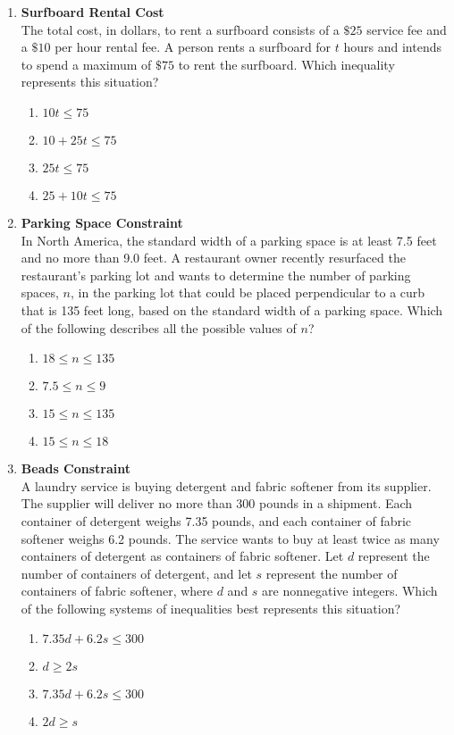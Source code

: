 \begin{enumerate}
\item \textbf{Surfboard Rental Cost}\\
The total cost, in dollars, to rent a surfboard consists of a $\$ 25$ service fee and a $\$ 10$ per hour rental fee. A person rents a surfboard for $t$ hours and intends to spend a maximum of $\$ 75$ to rent the surfboard. Which inequality represents this situation?
\begin{enumerate}[label=(\Alph*)]
  \item $10t \leq 75$
  \item $10 + 25t \leq 75$
  \item $25t \leq 75$
  \item $25 + 10t \leq 75$
\end{enumerate}
\begin{subanswer}
\end{subanswer}

\item \textbf{Parking Space Constraint}\\
In North America, the standard width of a parking space is at least 7.5 feet and no more than 9.0 feet. A restaurant owner recently resurfaced the restaurant's parking lot and wants to determine the number of parking spaces, $n$, in the parking lot that could be placed perpendicular to a curb that is 135 feet long, based on the standard width of a parking space. Which of the following describes all the possible values of $n$?
\begin{enumerate}[label=(\Alph*)]
  \item $18 \leq n \leq 135$
  \item $7.5 \leq n \leq 9$
  \item $15 \leq n \leq 135$
  \item $15 \leq n \leq 18$
\end{enumerate}
\begin{subanswer}
\end{subanswer}

\item \textbf{Beads Constraint}\\
A laundry service is buying detergent and fabric softener from its supplier. The supplier will deliver no more than 300 pounds in a shipment. Each container of detergent weighs 7.35 pounds, and each container of fabric softener weighs 6.2 pounds. The service wants to buy at least twice as many containers of detergent as containers of fabric softener. Let $d$ represent the number of containers of detergent, and let $s$ represent the number of containers of fabric softener, where $d$ and $s$ are nonnegative integers. Which of the following systems of inequalities best represents this situation?
\begin{enumerate}[label=(\Alph*)]
  \item $7.35d + 6.2s \leq 300$
  \item $d \geq 2s$
  \item $7.35d + 6.2s \leq 300$
  \item $2d \geq s$
\end{enumerate}
\begin{subanswer}
\end{subanswer}


\end{enumerate}
